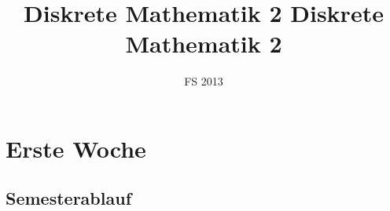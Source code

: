 \documentclass[18pt,a4paper]{article}
\title{Diskrete Mathematik 2}
\title{
	\vspace{5cm}
	Diskrete Mathematik 2 \\
}
\date{FS 2013}
\begin{document}
\maketitle
\thispagestyle{fancy}
\newpage

\tableofcontents	  	
\newpage



\section{Erste Woche}


\subsection{Semesterablauf}
\end{document}
